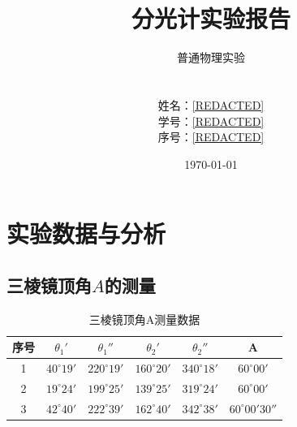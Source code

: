 \documentclass[12pt]{article}
\title{\Large\textbf{分光计实验报告}}
\author{普通物理实验\\
        [REDACTED]\\
         \\
        姓名：\underline{\hspace{1cm}[REDACTED]\hspace{1cm}} \\
        学号：\underline{\hspace{0.5cm}[REDACTED]\hspace{0.5cm}} \\
        序号：\underline{\hspace{1.3cm}[REDACTED]\hspace{1.3cm}}}
\date{\today}
\begin{document}
\maketitle





\section{实验数据与分析}
\subsection{三棱镜顶角$A$的测量}
\begin{table}[H]
    \centering
    \begin{tabular}{cccccc}
        序号 & $\theta_1'$     & $\theta_1''$     & $\theta_2'$      & $\theta_2''$     & A                   \\ \hline
        1  & $40^{\circ}19'$ & $220^{\circ}19'$ & $160^{\circ}20'$ & $340^{\circ}18'$ & $60^{\circ}00'$     \\
        2  & $19^{\circ}24'$ & $199^{\circ}25'$ & $139^{\circ}25'$ & $319^{\circ}24'$ & $60^{\circ}00'$     \\
        3  & $42^{\circ}40'$ & $222^{\circ}39'$ & $162^{\circ}40'$ & $342^{\circ}38'$ & $60^{\circ}00'30''$
        \end{tabular}
    \caption{三棱镜顶角A测量数据}
\end{table}
\end{document}
